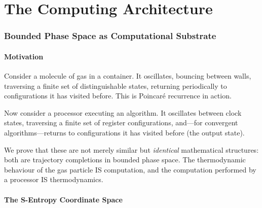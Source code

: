 \documentclass[twocolumn,10pt,a4paper]{article}
\theoremstyle{plain}
\theoremstyle{definition}
\theoremstyle{remark}
\begin{document}
\tableofcontents


\part{The Computing Architecture}
\label{part:architecture}

\section{Bounded Phase Space as Computational Substrate}
\label{sec:substrate}

\subsection{Motivation}

Consider a molecule of gas in a container. It oscillates, bouncing between walls, traversing a finite set of distinguishable states, returning periodically to configurations it has visited before. This is Poincar\'{e} recurrence in action.

Now consider a processor executing an algorithm. It oscillates between clock states, traversing a finite set of register configurations, and---for convergent algorithms---returns to configurations it has visited before (the output state).

We prove that these are not merely similar but \emph{identical} mathematical structures: both are trajectory completions in bounded phase space. The thermodynamic behaviour of the gas particle IS computation, and the computation performed by a processor IS thermodynamics.

\subsection{The S-Entropy Coordinate Space}
\end{document}

